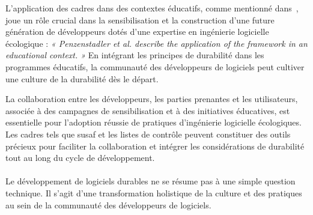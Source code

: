 L'application des cadres dans des contextes éducatifs, comme mentionné dans~\cite{SustainabilityRequirementsEngineering}, joue un rôle crucial dans la sensibilisation et la construction d'une future génération de développeurs dotés d'une expertise en ingénierie logicielle écologique : \emph{« Penzenstadler et al. describe the application of the framework in an educational context. »} En intégrant les principes de durabilité dans les programmes éducatifs, la communauté des développeurs de logiciels peut cultiver une culture de la durabilité dès le départ.


La collaboration entre les développeurs, les parties prenantes et les utilisateurs, associée à des campagnes de sensibilisation et à des initiatives éducatives, est essentielle pour l'adoption réussie de pratiques d'ingénierie logicielle écologiques. Les cadres tels que \acrshort{susaf} et les listes de contrôle peuvent constituer des outils précieux pour faciliter la collaboration et intégrer les considérations de durabilité tout au long du cycle de développement.


\paragraph{}
Le développement de logiciels durables ne se résume pas à une simple question technique. Il s'agit d'une transformation holistique de la culture et des pratiques au sein de la communauté des développeurs de logiciels.

